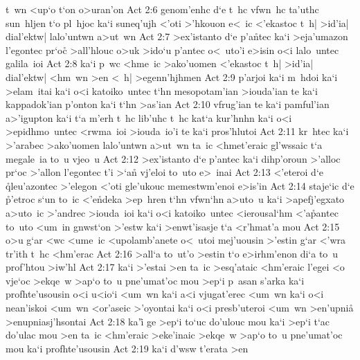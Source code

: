 t~wn
<up`o
t`on
o>uran'on\bibvsend
\vs Act 2:6
genom'enhc
d`e
t~hc
vfwn~hc
ta'uthc
sun~hljen
t`o
pl~hjoc
ka`i
suneq'ujh
<'oti
>'hkouon
e<~ic
<'ekastoc
t~h|
>id'ia|
dial'ektw|
lalo'untwn
a>ut~wn\bibvsend
\vs Act 2:7
>ex'istanto
d`e
p'a\r{n}tec
ka`i
>eja'umazon
l'egontec
pr`oc\r{}
>all'hlouc
o>uk
>ido`u
p'antec
o<~uto'i
e>isin
o<i
lalo~untec
galila~ioi\bibvsend
\vs Act 2:8
ka`i
p~wc
<hme~ic
>ako'uomen
<'ekastoc
t~h|
>id'ia|
dial'ektw|
<hm~wn
>en
<~h|
>egenn'hjhmen\bibvsend
\vs Act 2:9
p'arjoi
ka`i
m~hdoi
ka`i
>elam~itai
ka`i
o<i
katoiko~untec
t`hn
mesopotam'ian
>iouda'ian
te
ka`i
kappadok'ian
p'onton
ka`i
t`hn
>as'ian\bibvsend
\vs Act 2:10
vfrug'ian
te
ka`i
pamful'ian
a>'igupton
ka`i
t`a
m'erh
t~hc
lib'uhc
t~hc
kat`a
kur'hnhn
ka`i
o<i
>epidhmo~untec
<rwma~ioi
>iouda~io'i
te
ka`i
pros'hlutoi\bibvsend
\vs Act 2:11
kr~htec
ka`i
>'arabec
>ako'uomen
lalo'untwn
a>ut~wn
ta~ic
<hmet'eraic
gl'wssaic
t`a
megale~ia
to~u
vjeo~u\bibvsend
\vs Act 2:12
>ex'istanto
d`e
p'antec
ka`i
dihp'oroun
>'alloc
pr`oc
>'allon
l'egontec
t'i
>`an\r{}
vj'eloi
to~uto
e>~inai\bibvsend
\vs Act 2:13
<'eteroi
d`e
\r{q}leu'azontec
>'elegon
<'oti
gle'ukouc
memestwm'enoi
e>is'in\bibvsend
\vs Act 2:14
staje`ic
d`e
\r{p}'etroc
s`un
to~ic
<'e\r{n}deka
>ep~hren
t`hn
vfwn`hn
a>uto~u
ka`i
>apefj'egxato
a>uto~ic
>'andrec
>iouda~ioi
ka`i
o<i
katoiko~untec
<ierousal`hm
<'a\r{p}antec
to~uto
<um~in
gnwst`on
>'estw
ka`i
>enwt'isasje
t`a
<r'hmat'a
mou\bibvsend
\vs Act 2:15
o>u
g`ar
<wc
<ume~ic
<upolamb'anete
o<~utoi
mej'uousin
>'estin
g`ar
<'wra
tr'ith
t~hc
<hm'erac\bibvsend
\vs Act 2:16
>all`a
to~ut'o
>estin
t`o
e>irhm'enon
di`a
to~u
prof'htou
>iw'hl\bibvsend
\vs Act 2:17
ka`i
>'estai
>en
ta~ic
>esq'ataic
<hm'eraic
l'egei
<o
vje`oc
>ekqe~w
>ap`o
to~u
pne'umat'oc
mou
>ep`i
p~asan
s'arka
ka`i
profhte'usousin
o<i
u<io`i
<um~wn
ka`i
a<i
vjugat'erec
<um~wn
ka`i
o<i
nean'iskoi
<um~wn
<or'aseic
>'oyontai
ka`i
o<i
presb'uteroi
<um~wn
>en'upni\r{a}
>enupniasj'hsontai\bibvsend
\vs Act 2:18
ka'i\r{}
ge
>ep`i
to`uc
do'ulouc
mou
ka`i
>ep`i
t`ac
do'ulac
mou
>en
ta~ic
<hm'eraic
>eke'inaic
>ekqe~w
>ap`o
to~u
pne'umat'oc
mou
ka`i
profhte'usousin\bibvsend
\vs Act 2:19
ka`i
d'wsw
t'erata
>en
